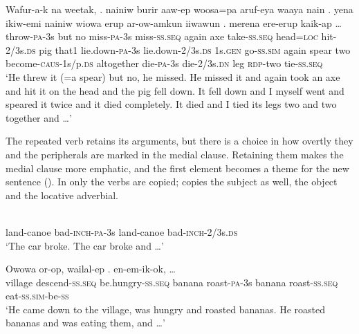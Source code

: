 \ea%
\label{ex:8:x1505}
\gll Wafur-a-k  na  weetak,  .   nainiw  burir  aaw-ep  woosa=pa  aruf-eya  waaya nain  .    yena  ikiw-emi  nainiw wiowa  erup  ar-ow-amkun  iiwawun  .   merena  ere-erup  kaik-ap  {\dots}\\
throw-\textsc{pa}-3s  but  no  miss-\textsc{pa}-3s  miss-\textsc{ss}.\textsc{seq} again  axe  take-\textsc{ss}.\textsc{seq} head=\textsc{loc} hit-2/3s.\textsc{ds} pig that1 lie.down-\textsc{pa}-3s lie.down-2/3s.\textsc{ds} 1s.\textsc{gen} go-\textsc{ss}.\textsc{sim} again spear  two  become-\textsc{caus}-1s/p.\textsc{ds} altogether die-\textsc{pa}-3s die-2/3s.\textsc{dn} leg \textsc{rdp}-two  tie-\textsc{ss}.\textsc{seq}\\
\glt`He threw it (=a spear) but no, he missed. He missed it and again took an axe and hit it on the head and the pig fell down. It fell down and I myself went and speared it twice and it died completely. It died and I tied its legs two and two together and {\dots}'
\z


The repeated verb retains its arguments, but there is a choice in how overtly they and the peripherals are marked in the medial clause. Retaining them makes the medial clause more emphatic, and the first element becomes a theme for the new sentence (). In  only the verbs are copied;  copies the subject as well,  the object and  the locative adverbial.

\ea%
\label{ex:8:x1506}
\gll {}      \\
land-canoe  bad-\textsc{inch}-\textsc{pa}-3s land-canoe bad-\textsc{inch}-2/3s.\textsc{ds}\\
\glt`The car broke. The car broke and {\dots}'
\z


\ea%
\label{ex:8:x1507}
\gll Owowa  or-op,  wailal-ep   .    en-em-ik-ok, {\dots} \\
village  descend-\textsc{ss}.\textsc{seq} be.hungry-\textsc{ss}.\textsc{seq} banana  roast-\textsc{pa}-3s banana roast-\textsc{ss}.\textsc{seq}  eat-\textsc{ss}.\textsc{sim}-be-\textsc{ss}\\
\glt`He came down to the village, was hungry and roasted bananas. He roasted bananas and was eating them, and {\dots}'
\z


